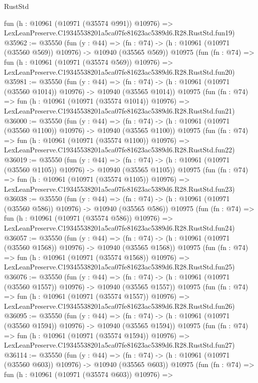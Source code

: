 \begin{lexlean}{RustStd}
\begin{coremodule}
    fun (h : @10961 (@10971 (@35574 @991)) @10976) =>
    LexLeanPreserve.C19345538201a5ca07fe81623ac5389d6.R28.RustStd.fun19)
@35962 := @35550
    (fun (y : @44) =>
    (fn : @74) -> (h : @10961 (@10971 (@35560 @569)) @10976) -> @10940 (@35565 @569))
    @10975
    (fun (fn : @74) =>
    fun (h : @10961 (@10971 (@35574 @569)) @10976) =>
    LexLeanPreserve.C19345538201a5ca07fe81623ac5389d6.R28.RustStd.fun20)
@35981 := @35550
    (fun (y : @44) =>
    (fn : @74) -> (h : @10961 (@10971 (@35560 @1014)) @10976) -> @10940 (@35565 @1014))
    @10975
    (fun (fn : @74) =>
    fun (h : @10961 (@10971 (@35574 @1014)) @10976) =>
    LexLeanPreserve.C19345538201a5ca07fe81623ac5389d6.R28.RustStd.fun21)
@36000 := @35550
    (fun (y : @44) =>
    (fn : @74) -> (h : @10961 (@10971 (@35560 @1100)) @10976) -> @10940 (@35565 @1100))
    @10975
    (fun (fn : @74) =>
    fun (h : @10961 (@10971 (@35574 @1100)) @10976) =>
    LexLeanPreserve.C19345538201a5ca07fe81623ac5389d6.R28.RustStd.fun22)
@36019 := @35550
    (fun (y : @44) =>
    (fn : @74) -> (h : @10961 (@10971 (@35560 @1105)) @10976) -> @10940 (@35565 @1105))
    @10975
    (fun (fn : @74) =>
    fun (h : @10961 (@10971 (@35574 @1105)) @10976) =>
    LexLeanPreserve.C19345538201a5ca07fe81623ac5389d6.R28.RustStd.fun23)
@36038 := @35550
    (fun (y : @44) =>
    (fn : @74) -> (h : @10961 (@10971 (@35560 @586)) @10976) -> @10940 (@35565 @586))
    @10975
    (fun (fn : @74) =>
    fun (h : @10961 (@10971 (@35574 @586)) @10976) =>
    LexLeanPreserve.C19345538201a5ca07fe81623ac5389d6.R28.RustStd.fun24)
@36057 := @35550
    (fun (y : @44) =>
    (fn : @74) -> (h : @10961 (@10971 (@35560 @1568)) @10976) -> @10940 (@35565 @1568))
    @10975
    (fun (fn : @74) =>
    fun (h : @10961 (@10971 (@35574 @1568)) @10976) =>
    LexLeanPreserve.C19345538201a5ca07fe81623ac5389d6.R28.RustStd.fun25)
@36076 := @35550
    (fun (y : @44) =>
    (fn : @74) -> (h : @10961 (@10971 (@35560 @1557)) @10976) -> @10940 (@35565 @1557))
    @10975
    (fun (fn : @74) =>
    fun (h : @10961 (@10971 (@35574 @1557)) @10976) =>
    LexLeanPreserve.C19345538201a5ca07fe81623ac5389d6.R28.RustStd.fun26)
@36095 := @35550
    (fun (y : @44) =>
    (fn : @74) -> (h : @10961 (@10971 (@35560 @1594)) @10976) -> @10940 (@35565 @1594))
    @10975
    (fun (fn : @74) =>
    fun (h : @10961 (@10971 (@35574 @1594)) @10976) =>
    LexLeanPreserve.C19345538201a5ca07fe81623ac5389d6.R28.RustStd.fun27)
@36114 := @35550
    (fun (y : @44) =>
    (fn : @74) -> (h : @10961 (@10971 (@35560 @603)) @10976) -> @10940 (@35565 @603))
    @10975
    (fun (fn : @74) =>
    fun (h : @10961 (@10971 (@35574 @603)) @10976) =>

\end{coremodule}
\end{lexlean}
